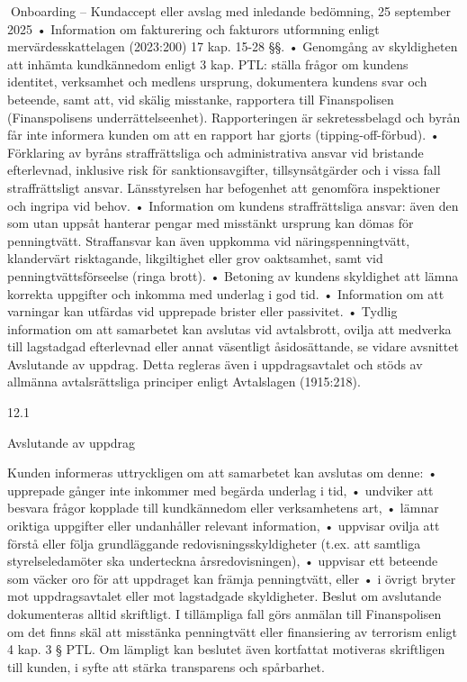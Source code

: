 Onboarding – Kundaccept eller avslag med inledande bedömning,
25 september 2025
• Information om fakturering och fakturors utformning enligt mervärdesskattelagen (2023:200)
17 kap. 15-28 §§.
• Genomgång av skyldigheten att inhämta kundkännedom enligt 3 kap. PTL: ställa frågor om kundens identitet, verksamhet och medlens ursprung, dokumentera kundens
svar och beteende, samt att, vid skälig misstanke, rapportera till Finanspolisen (Finanspolisens underrättelseenhet). Rapporteringen är sekretessbelagd och byrån får inte
informera kunden om att en rapport har gjorts (tipping-off-förbud).
• Förklaring av byråns straffrättsliga och administrativa ansvar vid bristande efterlevnad,
inklusive risk för sanktionsavgifter, tillsynsåtgärder och i vissa fall straffrättsligt ansvar.
Länsstyrelsen har befogenhet att genomföra inspektioner och ingripa vid behov.
• Information om kundens straffrättsliga ansvar: även den som utan uppsåt hanterar
pengar med misstänkt ursprung kan dömas för penningtvätt. Straffansvar kan även uppkomma vid näringspenningtvätt, klandervärt risktagande, likgiltighet eller grov oaktsamhet, samt vid penningtvättsförseelse (ringa brott).
• Betoning av kundens skyldighet att lämna korrekta uppgifter och inkomma med underlag i god tid.
• Information om att varningar kan utfärdas vid upprepade brister eller passivitet.
• Tydlig information om att samarbetet kan avslutas vid avtalsbrott, ovilja att medverka till lagstadgad efterlevnad eller annat väsentligt åsidosättande, se vidare avsnittet
Avslutande av uppdrag. Detta regleras även i uppdragsavtalet och stöds av allmänna
avtalsrättsliga principer enligt Avtalslagen (1915:218).

12.1

Avslutande av uppdrag

Kunden informeras uttryckligen om att samarbetet kan avslutas om denne:
• upprepade gånger inte inkommer med begärda underlag i tid,
• undviker att besvara frågor kopplade till kundkännedom eller verksamhetens art,
• lämnar oriktiga uppgifter eller undanhåller relevant information,
• uppvisar ovilja att förstå eller följa grundläggande redovisningsskyldigheter (t.ex. att
samtliga styrelseledamöter ska underteckna årsredovisningen),
• uppvisar ett beteende som väcker oro för att uppdraget kan främja penningtvätt, eller
• i övrigt bryter mot uppdragsavtalet eller mot lagstadgade skyldigheter.
Beslut om avslutande dokumenteras alltid skriftligt. I tillämpliga fall görs anmälan till
Finanspolisen om det finns skäl att misstänka penningtvätt eller finansiering av terrorism
enligt 4 kap. 3 § PTL. Om lämpligt kan beslutet även kortfattat motiveras skriftligen till
kunden, i syfte att stärka transparens och spårbarhet.

